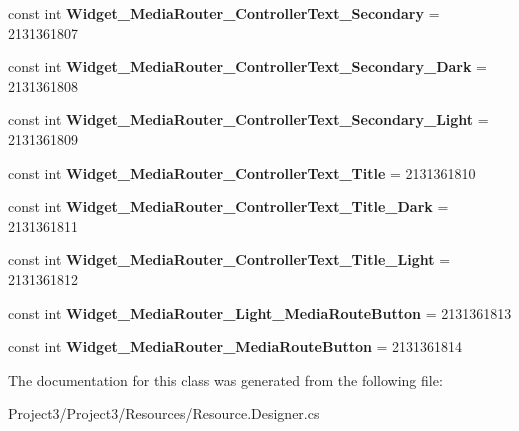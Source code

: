 \begin{DoxyCompactItemize}
\item 
\mbox{\label{classXaria_1_1Resource_1_1Style_a74930e4f1c50daa7da41a291d26ef458}} 
const int {\bfseries Widget\+\_\+\+Media\+Router\+\_\+\+Controller\+Text\+\_\+\+Secondary} = 2131361807
\item 
\mbox{\label{classXaria_1_1Resource_1_1Style_a7a2366ff692a1c0f0e5285817a01ebf7}} 
const int {\bfseries Widget\+\_\+\+Media\+Router\+\_\+\+Controller\+Text\+\_\+\+Secondary\+\_\+\+Dark} = 2131361808
\item 
\mbox{\label{classXaria_1_1Resource_1_1Style_a0ca23e7611bec6614cafaa2f05d1e880}} 
const int {\bfseries Widget\+\_\+\+Media\+Router\+\_\+\+Controller\+Text\+\_\+\+Secondary\+\_\+\+Light} = 2131361809
\item 
\mbox{\label{classXaria_1_1Resource_1_1Style_a270adf99cc1bcadce58b3cb819063964}} 
const int {\bfseries Widget\+\_\+\+Media\+Router\+\_\+\+Controller\+Text\+\_\+\+Title} = 2131361810
\item 
\mbox{\label{classXaria_1_1Resource_1_1Style_a1eb8e915bb8d81b67ef0d36e986ce4e1}} 
const int {\bfseries Widget\+\_\+\+Media\+Router\+\_\+\+Controller\+Text\+\_\+\+Title\+\_\+\+Dark} = 2131361811
\item 
\mbox{\label{classXaria_1_1Resource_1_1Style_a4f896f509980e28322f4eef28ddf0e7f}} 
const int {\bfseries Widget\+\_\+\+Media\+Router\+\_\+\+Controller\+Text\+\_\+\+Title\+\_\+\+Light} = 2131361812
\item 
\mbox{\label{classXaria_1_1Resource_1_1Style_aa8581866b116d53a60ac9c4b56295a9e}} 
const int {\bfseries Widget\+\_\+\+Media\+Router\+\_\+\+Light\+\_\+\+Media\+Route\+Button} = 2131361813
\item 
\mbox{\label{classXaria_1_1Resource_1_1Style_a88b701ea4ec752d0f8adf71fcea1dcdd}} 
const int {\bfseries Widget\+\_\+\+Media\+Router\+\_\+\+Media\+Route\+Button} = 2131361814
\end{DoxyCompactItemize}


The documentation for this class was generated from the following file\+:\begin{DoxyCompactItemize}
\item 
Project3/\+Project3/\+Resources/Resource.\+Designer.\+cs\end{DoxyCompactItemize}

